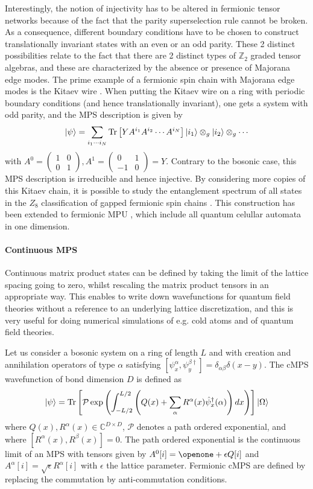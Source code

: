 \documentclass[rmp,aps,reprint,superscriptaddress,nobalancelastpage]{revtex4-1}
\newcommand{\be}{\begin{equation}}
\newcommand{\ee}{\end{equation}}
\newcommand{\mat}[2]{\left(\begin{array}{#1}#2\end{array}\right)}
\begin{document}
Interestingly, the notion of injectivity has to be altered in fermionic tensor networks because of the fact that the parity superselection rule cannot be broken. As a consequence, different boundary conditions have to be chosen to construct translationally invariant states with an even or an odd parity. These 2 distinct possibilities relate to the fact that there are 2 distinct types of $\mathbb{Z}_2$ graded tensor algebras, and these are characterized by the absence or presence of Majorana edge modes. The prime example of a fermionic spin chain with Majorana edge modes is the Kitaev wire \cite{kitaev:majorana-chain}. When putting the Kitaev wire on a ring with periodic boundary conditions (and hence translationally invariant), one gets a system with odd parity, and the MPS description is given by
\be |\psi\rangle=\sum_{i_1\cdots i_N}{\rm Tr}\left[YA^{i_1}A^{i_2}\cdots A^{i_N}\right]|i_1\rangle\otimes_g|i_2\rangle\otimes_g\cdots\label{Majchain}\ee
with $A^0=\mat{cc}{1&0\\0&1},A^1=\mat{cc}{0&1\\-1&0}=Y$. Contrary to the
bosonic case, this MPS description is irreducible and hence injective. By
considering more copies of this Kitaev chain, it is possible to study the
entanglement spectrum of all states in the $Z_8$ classification of gapped
fermionic spin chains
\cite{fidkowski:1d-fermions,bultinck:fermionic-mps-phases}. This construction has been extended to fermionic MPU \cite{Piroli:FermionMPU}, which include all quantum celullar automata in one dimension.

\paragraph{Continuous MPS}

Continuous matrix product states \cite{verstraete2010continuous,haegeman2013calculus} can be defined by taking the limit of the lattice spacing going to zero, whilst rescaling the matrix product tensors in an appropriate way. This enables to write down wavefunctions for quantum field theories without a reference to an underlying lattice discretization, and this is very useful for doing numerical simulations of e.g. cold atoms and of quantum field theories.


Let us consider a bosonic  system on a ring of length $L$ and with creation and annihilation operators of type $\alpha$ satisfying $\left[\psi^\alpha_x,\psi^{\beta\dagger}_y\right]=\delta_{\alpha\beta}\delta(x-y)$. The cMPS wavefunction of bond dimension $D$ is defined as
\be |\psi\rangle={\rm Tr}\left[\mathcal{P}\exp\left(\int_{-L/2}^{L/2} \left( Q(x)+\sum_\alpha R^\alpha(x)\hat{\psi}^\dagger_x(\alpha)\right)dx\right)\right]|\Omega\rangle \ee
where $Q(x),R^\alpha(x) \in \mathbb{C}^{D\times D}$, $\mathcal{P}$ denotes a path ordered exponential, and where $[R^\alpha(x),R^\beta(x)]=0$. The path ordered exponential is the continuous limit of an MPS with tensors given by $A^0[i]=\openone+\epsilon Q[i]$ and $A^\alpha[i]=\sqrt{\epsilon}R^\alpha[i]$ with $\epsilon$ the lattice parameter. Fermionic cMPS are defined by replacing the commutation by anti-commutation conditions.
\end{document}
